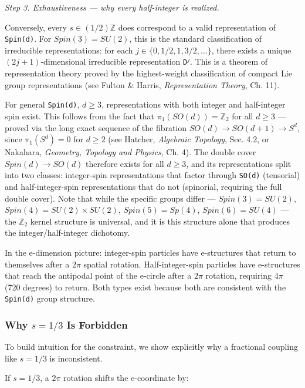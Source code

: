 \documentclass[aps,prd,preprint,superscriptaddress,longbibliography,floatfix]{revtex4-2}
\theoremstyle{remark}
\begin{document}
\textit{Step 3. Exhaustiveness --- why every half-integer is realized.}

Conversely, every $s \in (1/2)\mathbb{Z}$ does correspond to a valid representation of \texttt{Spin(d)}. For $Spin(3) = SU(2)$, this is the standard classification of irreducible representations: for each $j \in \{0, 1/2, 1, 3/2, \ldots\}$, there exists a unique $(2j + 1)$-dimensional irreducible representation \texttt{D$^{j}$}. This is a theorem of representation theory proved by the highest-weight classification of compact Lie group representations (see Fulton \& Harris, \textit{Representation Theory}, Ch. 11).

For general \texttt{Spin(d)}, $d \geq 3$, representations with both integer and half-integer spin exist. This follows from the fact that $\pi_{1}(SO(d)) = \mathbb{Z}_{2}$ for all $d \geq 3$ --- proved via the long exact sequence of the fibration $SO(d) \to SO(d+1) \to S^{d}$, since $\pi_{1}(S^{d}) = 0$ for $d \geq 2$ (see Hatcher, \textit{Algebraic Topology}, Sec. 4.2, or Nakahara, \textit{Geometry, Topology and Physics}, Ch. 4). The double cover $Spin(d) \to SO(d)$ therefore exists for all $d \geq 3$, and its representations split into two classes: integer-spin representations that factor through \texttt{SO(d)} (tensorial) and half-integer-spin representations that do not (spinorial, requiring the full double cover). Note that while the specific groups differ --- $Spin(3) = SU(2)$, $Spin(4) = SU(2) \times SU(2)$, $Spin(5) = Sp(4)$, $Spin(6) = SU(4)$ --- the $\mathbb{Z}_{2}$ kernel structure is universal, and it is this structure alone that produces the integer/half-integer dichotomy.

In the e-dimension picture: integer-spin particles have e-structures that return to themselves after a $2\pi$ spatial rotation. Half-integer-spin particles have e-structures that reach the antipodal point of the e-circle after a $2\pi$ rotation, requiring $4\pi$ (720 degrees) to return. Both types exist because both are consistent with the \texttt{Spin(d)} group structure.


\subsubsection{Why $s = 1/3$ Is Forbidden}

To build intuition for the constraint, we show explicitly why a fractional coupling like $s = 1/3$ is inconsistent.

If $s = 1/3$, a $2\pi$ rotation shifts the e-coordinate by:
\end{document}
